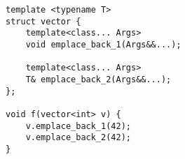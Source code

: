 \begin{lstlisting}[title=\href{https://godbolt.org/z/dYMsza}{\texttt{godbolt.org/z/dYMsza}}]
template <typename T>
struct vector {
    template<class... Args> 
    void emplace_back_1(Args&&...);

    template<class... Args> 
    T& emplace_back_2(Args&&...);
};

void f(vector<int> v) {
    v.emplace_back_1(42);
    v.emplace_back_2(42);
}
\end{lstlisting}
